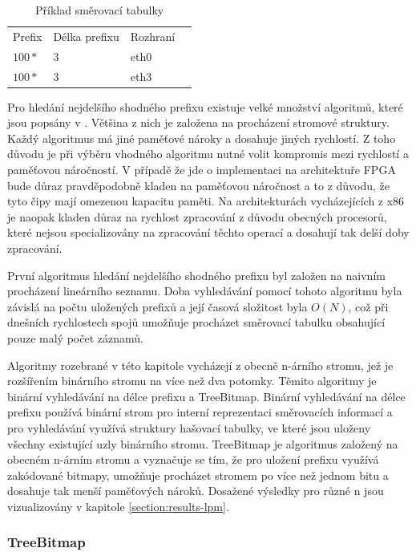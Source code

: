 \begin{table}[!htbp]
	\center
    \begin{tabular}{|l|l|l|l|}
    \hline
    Prefix & Délka prefixu & Rozhraní \\ \hhline{|=|=|=|=|}
    $100*$ & 3 & eth0 \\ \hline
    $100*$ & 3 & eth3 \\ \hline
    \end{tabular}
    \caption{Příklad směrovací tabulky}
\end{table}

Pro hledání nejdelšího shodného prefixu existuje velké množství algoritmů, které jsou popsány v \cite{tbm}.
Většina z nich je založena na procházení stromové struktury. Každý algoritmus má jiné paměťové nároky
a dosahuje jiných rychlostí. Z toho důvodu je při výběru vhodného algoritmu nutné
volit kompromis mezi rychlostí a paměťovou náročností.
V případě že jde o implementaci na architektuře FPGA bude důraz pravděpodobně kladen na paměťovou náročnost
a to z důvodu, že tyto čipy mají omezenou kapacitu paměti. Na architekturách vycházejících z x86 je naopak kladen důraz
na rychlost zpracování z důvodu obecných procesorů, které nejsou specializovány na zpracování těchto operací
a dosahují tak delší doby zpracování.

První algoritmus hledání nejdelšího shodného prefixu byl založen na naivním procházení lineárního
seznamu. Doba vyhledávání pomocí tohoto algoritmu byla závislá na počtu uložených prefixů a její
časová složitost byla $O(N)$, což při dnešních rychlostech spojů umožňuje procházet směrovací tabulku
obsahující pouze malý počet záznamů.

Algoritmy rozebrané v této kapitole vycházejí z obecně n-árního stromu,
jež je rozšířením binárního stromu na více než dva potomky.
Těmito algoritmy je binární vyhledávání na délce prefixu a TreeBitmap.
Binární vyhledávání na délce prefixu používá binární strom pro interní reprezentaci směrovacích
informací a pro vyhledávání využívá struktury hašovací tabulky, ve které jsou uloženy všechny existující uzly
binárního stromu.
TreeBitmap je algoritmus založený na obecném n-árním stromu a vyznačuje se tím,
že pro uložení prefixu využívá zakódované bitmapy, umožňuje procházet stromem
po více než jednom bitu a dosahuje tak menší paměťových nároků.
Dosažené výsledky pro různé n jsou vizualizovány v kapitole \ref{section:results-lpm}.


\subsubsection{TreeBitmap} %

